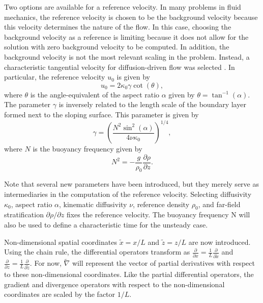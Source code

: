 \documentclass[12pt]{article}
\begin{document}
Two options are available for a reference velocity. In many problems in fluid mechanics, the reference velocity is chosen to be the background velocity \cite{anderson2010fundamentals} because this velocity determines the nature of the flow. In this case, choosing the background velocity as a reference is limiting because it does not allow for the solution with zero background velocity to be computed. In addition, the background velocity is not the most relevant scaling in the problem. Instead, a characteristic tangential velocity for diffusion-driven flow was selected \cite{phillips1970flows}. In particular, the reference velocity $u_0$ is given by
\begin{equation}
u_0 = 2\kappa_0\gamma\cot(\theta),
\end{equation}
where $\theta$ is the angle-equivalent of the aspect ratio $\alpha$ given by $\theta = \tan^{-1}(\alpha)$. The parameter $\gamma$ is inversely related to the length scale of the boundary layer formed next to the sloping surface. This parameter \cite{phillips1970flows} is given by
\begin{equation}
\gamma = \left(\frac{N^2\sin^2(\alpha)}{4\nu\kappa_0}\right)^{1/4},
\end{equation}
where $N$ is the buoyancy frequency \cite{turner1979buoyancy} given by
\begin{equation}
N^2 = -\frac{g}{\rho_0}\frac{\partial\rho}{\partial z}.
\end{equation}

Note that several new parameters have been introduced, but they merely serve as intermediaries in the computation of the reference velocity. Selecting diffusivity $\kappa_0$, aspect ratio $\alpha$, kinematic diffusivity $\nu$, reference density $\rho_0$, and far-field stratification $\partial\rho/\partial z$ fixes the reference velocity. The buoyancy frequency N will also be used to define a characteristic time for the unsteady case.

Non-dimensional spatial coordinates $\tilde{x}=x/L$ and $\tilde{z}=z/L$ are now introduced. Using the chain rule, the differential operators transform as $\frac{\partial}{\partial x}=\frac{1}{L}\frac{\partial}{\partial\tilde{x}}$ and $\frac{\partial}{\partial z}=\frac{1}{L}\frac{\partial}{\partial\tilde{z}}$. For now, $\tilde{\nabla}$ will represent the vector of partial derivatives with respect to these non-dimensional coordinates. Like the partial differential operators, the gradient and divergence operators with respect to the non-dimensional coordinates are scaled by the factor $1/L$.
\end{document}
